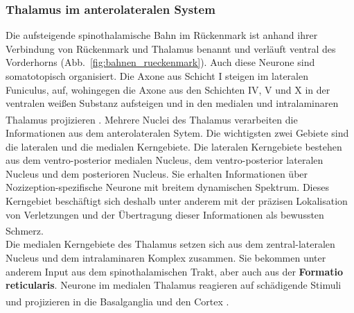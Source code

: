 \documentclass[12pt,a4paper,pdftex]{article}
\begin{document}
\subsubsection*{Thalamus im anterolateralen System}
Die aufsteigende spinothalamische Bahn  im Rückenmark ist anhand ihrer Verbindung von Rückenmark und Thalamus benannt und verläuft ventral des Vorderhorns  (Abb.~\ref{fig:bahnen_rueckenmark}). Auch diese Neurone sind somatotopisch organisiert. Die Axone aus Schicht I steigen im lateralen Funiculus, auf, wohingegen die Axone aus den Schichten IV, V und X in der ventralen weißen Substanz aufsteigen und in den medialen und intralaminaren Thalamus projizieren \textsuperscript{\cite[25]{paxinos2014rat}}. 
Mehrere Nuclei des Thalamus verarbeiten die Informationen aus dem anterolateralen Sytem. Die wichtigsten zwei Gebiete sind die lateralen und die medialen Kerngebiete. 
Die lateralen Kerngebiete bestehen aus dem ventro-posterior medialen Nucleus, dem ventro-posterior lateralen Nucleus und dem posterioren Nucleus. Sie erhalten Informationen über Nozizeption-spezifische Neurone mit breitem dynamischen Spektrum. Dieses Kerngebiet beschäftigt sich deshalb unter anderem mit der präzisen Lokalisation von Verletzungen und der Übertragung dieser Informationen als bewussten Schmerz\textsuperscript{\cite[24]{kandel2013principles}}.
\\
\noindent Die medialen Kerngebiete des Thalamus setzen sich aus dem zentral-lateralen Nucleus und dem intralaminaren Komplex zusammen. Sie bekommen unter anderem Input aus dem spinothalamischen Trakt, aber auch aus der \textbf{Formatio reticularis}. Neurone im medialen Thalamus reagieren auf schädigende Stimuli und projizieren in die Basalganglia und den Cortex \textsuperscript{\cite[24]{kandel2013principles}}.
\end{document}
